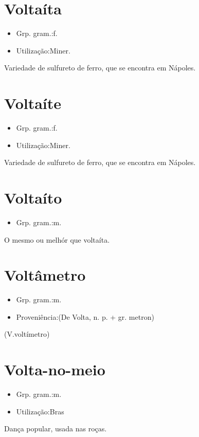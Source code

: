 \documentclass{article}
\begin{document}
\section{Voltaíta}
\begin{itemize}
\item {Grp. gram.:f.}
\end{itemize}
\begin{itemize}
\item {Utilização:Miner.}
\end{itemize}
Variedade de sulfureto de ferro, que se encontra em Nápoles.
\section{Voltaíte}
\begin{itemize}
\item {Grp. gram.:f.}
\end{itemize}
\begin{itemize}
\item {Utilização:Miner.}
\end{itemize}
Variedade de sulfureto de ferro, que se encontra em Nápoles.
\section{Voltaíto}
\begin{itemize}
\item {Grp. gram.:m.}
\end{itemize}
O mesmo ou melhór que \textunderscore voltaíta\textunderscore .
\section{Voltâmetro}
\begin{itemize}
\item {Grp. gram.:m.}
\end{itemize}
\begin{itemize}
\item {Proveniência:(De \textunderscore Volta\textunderscore , n. p. + gr. \textunderscore metron\textunderscore )}
\end{itemize}
(V.voltímetro)
\section{Volta-no-meio}
\begin{itemize}
\item {Grp. gram.:m.}
\end{itemize}
\begin{itemize}
\item {Utilização:Bras}
\end{itemize}
Dança popular, usada nas roças.
\end{document}
